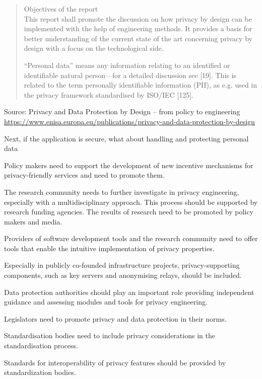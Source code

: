 \documentclass[Screen16to9,17pt]{foils}
\begin{document}

\begin{quote}
Objectives of the report\\
This report shall promote the discussion on how privacy by design can be implemented with the help
of engineering methods. It provides a basis for better understanding of the current state of the art
concerning privacy by design with a focus on the technological side.

“Personal data” means any information relating to an identified or identifiable natural person—for a
detailed discussion see [19]. This is related to the term personally identifiable information (PII), as e.g.
used in the privacy framework standardised by ISO/IEC [125].
\end{quote}
Source:
Privacy and Data Protection by Design
– from policy to engineering\\
{\footnotesize\url{https://www.enisa.europa.eu/publications/privacy-and-data-protection-by-design}}
\begin{list2}
\item Next, if the application is secure, what about handling and protecting personal data
\end{list2}


\begin{list2}
\item {\small Policy makers need to support the development of new incentive mechanisms for privacy-friendly services and need to promote them.}
\item {\small The research community needs to further investigate in privacy engineering, especially with a
multidisciplinary approach. This process should be supported by research funding agencies.
The results of research need to be promoted by policy makers and media.}
\item {\small Providers of software development tools and the research community need to offer tools that
enable the intuitive implementation of privacy properties.}
\item {\small Especially in publicly co-founded infrastructure projects, privacy-supporting components,
such as key servers and anonymising relays, should be included.}
\item {\small Data protection authorities should play an important role providing independent guidance
and assessing modules and tools for privacy engineering.}
\item {\small Legislators need to promote privacy and data protection in their norms.}
\item {\small Standardisation bodies need to include privacy considerations in the standardisation process.}
\item {\small Standards for interoperability of privacy features should be provided by standardization bodies.}
\end{list2}
\end{document}
